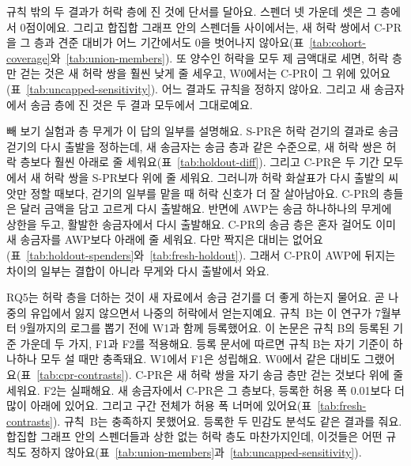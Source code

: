 규칙 밖의 두 결과가 허락 층에 진 것에 단서를 달아요. 스펜더 넷 가운데 셋은 그 층에서 0점이에요. 그리고 합집합 그래프 안의 스펜더들 사이에서는, 새 허락 쌍에서 \mbox{C-PR}을 그 층과 견준 대비가 어느 기간에서도 0을 벗어나지 않아요(표~\ref{tab:cohort-coverage}와~\ref{tab:union-members}). 또 양수인 허락을 모두 제 금액대로 세면, 허락 층만 걷는 것은 새 허락 쌍을 훨씬 낮게 줄 세우고, W0에서는 \mbox{C-PR}이 그 위에 있어요(표~\ref{tab:uncapped-sensitivity}). 어느 결과도 규칙을 정하지 않아요. 그리고 새 송금자에서 송금 층에 진 것은 두 결과 모두에서 그대로예요.

빼 보기 실험과 층 무게가 이 답의 일부를 설명해요. \mbox{S-PR}은 허락 걷기의 결과로 송금 걷기의 다시 출발을 정하는데, 새 송금자는 송금 층과 같은 수준으로, 새 허락 쌍은 허락 층보다 훨씬 아래로 줄 세워요(표~\ref{tab:holdout-diff}). 그리고 \mbox{C-PR}은 두 기간 모두에서 새 허락 쌍을 \mbox{S-PR}보다 위에 줄 세워요. 그러니까 허락 화살표가 다시 출발의 씨앗만 정할 때보다, 걷기의 일부를 맡을 때 허락 신호가 더 잘 살아남아요. \mbox{C-PR}의 층들은 달러 금액을 담고 고르게 다시 출발해요. 반면에 AWP는 송금 하나하나의 무게에 상한을 두고, 활발한 송금자에서 다시 출발해요. \mbox{C-PR}의 송금 층은 혼자 걸어도 이미 새 송금자를 AWP보다 아래에 줄 세워요. 다만 짝지은 대비는 없어요(표~\ref{tab:holdout-spenders}와~\ref{tab:fresh-holdout}). 그래서 \mbox{C-PR}이 AWP에 뒤지는 차이의 일부는 결합이 아니라 무게와 다시 출발에서 와요.


RQ5는 허락 층을 더하는 것이 새 자료에서 송금 걷기를 더 좋게 하는지 물어요. 곧 나중의 유입에서 잃지 않으면서 나중의 허락에서 얻는지예요. 규칙~B는 이 연구가 7월부터 9월까지의 로그를 뽑기 전에 W1과 함께 등록했어요. 이 논문은 규칙 B의 등록된 기준 가운데 두 가지, F1과 F2를 적용해요. 등록 문서에 따르면 규칙 B는 자기 기준이 하나하나 모두 설 때만 충족돼요. W1에서 F1은 성립해요. W0에서 같은 대비도 그랬어요(표~\ref{tab:cpr-contrasts}). \mbox{C-PR}은 새 허락 쌍을 자기 송금 층만 걷는 것보다 위에 줄 세워요. F2는 실패해요. 새 송금자에서 \mbox{C-PR}은 그 층보다, 등록한 허용 폭 0.01보다 더 많이 아래에 있어요. 그리고 구간 전체가 허용 폭 너머에 있어요(표~\ref{tab:fresh-contrasts}). 규칙~B는 충족하지 못했어요. 등록한 두 민감도 분석도 같은 결과를 줘요. 합집합 그래프 안의 스펜더들과 상한 없는 허락 층도 마찬가지인데, 이것들은 어떤 규칙도 정하지 않아요(표~\ref{tab:union-members}과~\ref{tab:uncapped-sensitivity}).

